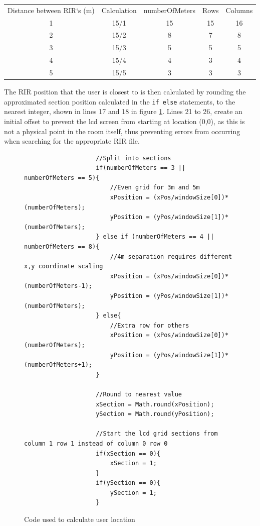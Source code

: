 \documentclass[../../main.tex]{subfiles}
\begin{document}
					\begin{center}
					\begin{tabular}{c c c c c}
						Distance between \ac{RIR}`s (m) & Calculation & numberOfMeters & Rows & Columns\\
						1 & 15/1 & 15 & 15 & 16\\
						2 & 15/2 & 8 & 7 & 8\\
						3 & 15/3 & 5 & 5 & 5\\
						4 & 15/4 & 4 & 3 & 4\\
						5 & 15/5 & 3 & 3 & 3\\
					\end{tabular}
				\end{center}

				\vspace{5mm}

				The \ac{RIR} position that the user is closest to is then calculated by rounding the approximated section position calculated in the \texttt{if else} statements, to the nearest integer, shown in lines 17 and 18 in figure \ref{jsPosition}. Lines 21 to 26, create an initial offset to prevent the lcd screen from starting at location (0,0), as this is not a physical point in the room itself, thus preventing errors from occurring when searching for the appropriate \ac{RIR} file.

				\begin{figure}[H]
				\begin{lstlisting}
					//Split into sections
					if(numberOfMeters == 3 || numberOfMeters == 5){
						//Even grid for 3m and 5m
						xPosition = (xPos/windowSize[0])*(numberOfMeters);
						yPosition = (yPos/windowSize[1])*(numberOfMeters);
					} else if (numberOfMeters == 4 || numberOfMeters == 8){
						//4m separation requires different x,y coordinate scaling
						xPosition = (xPos/windowSize[0])*(numberOfMeters-1);
						yPosition = (yPos/windowSize[1])*(numberOfMeters);
					} else{
						//Extra row for others
						xPosition = (xPos/windowSize[0])*(numberOfMeters); 
						yPosition = (yPos/windowSize[1])*(numberOfMeters+1);
					}	

					//Round to nearest value
					xSection = Math.round(xPosition);
					ySection = Math.round(yPosition); 
					
					//Start the lcd grid sections from column 1 row 1 instead of column 0 row 0
					if(xSection == 0){
						xSection = 1; 
					}
					if(ySection == 0){
						ySection = 1;
					}
					\end{lstlisting}
					\caption{Code used to calculate user location}
					\label{jsPosition}
					\end{figure}
\end{document}
